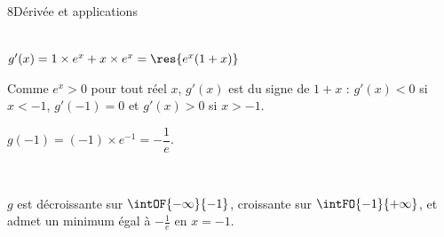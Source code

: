 \begin{corrige}{8}{Dérivée et applications}
\begin{questions}
  \item {}\\
    $g'(x)=1\times e^{x}+x\times e^{x}=\res{e^{x}(1+x)}$
  \item Comme $e^{x}>0$ pour tout réel $x$, $g'(x)$ est du signe de $1+x$ :
    $g'(x)<0$ si $x<-1$, $g'(-1)=0$ et $g'(x)>0$ si $x>-1$.
  \item $g(-1)=(-1)\times e^{-1}=-\dfrac{1}{e}$.
    \begin{center}
      \begin{tableau}
      \end{tableau}\\[1mm]
    \end{center}
    $g$ est décroissante sur $\intOF{-\infty}{-1}$, croissante sur $\intFO{-1}{+\infty}$,
    et admet un minimum égal à $-\frac{1}{e}$ en $x=-1$.
\end{questions}


\end{corrige}
